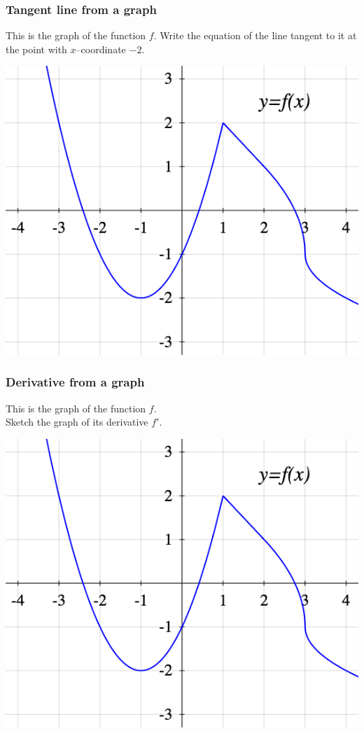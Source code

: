 \documentclass[14pt]{beamer}
\begin{document}

	\begin{frame}[t]
		\frametitle{Tangent line from a graph}
		This is the graph of the function $f$. Write the equation of the line
		tangent to it at the point with $x$--coordinate $-2$.
		\begin{center}
			\includegraphics[scale=.4]{G4}
		\end{center}
	\end{frame}

	\begin{frame}[t]
		\frametitle{Derivative from a graph}
		This is the graph of the function $f$. \\ Sketch the graph of its derivative
		$f'$.
		\begin{center}
			\includegraphics[scale=.4]{G4}
		\end{center}
	\end{frame}
\end{document}
